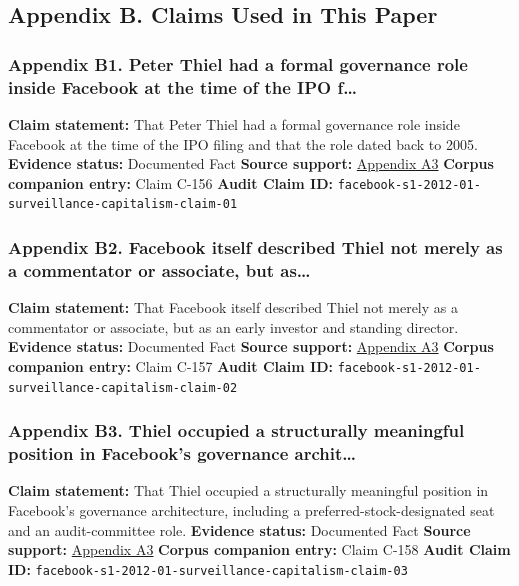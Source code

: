 \documentclass[
  american,
  11pt,
  letterpaper,
]{article}
\begin{document}
\subsection{Appendix B. Claims Used in This
Paper}\label{appendix-b.-claims-used-in-this-paper-1}

\subsubsection{Appendix B1. Peter Thiel had a formal governance role
inside Facebook at the time of the IPO
f\ldots{}}\label{ch-01-appendix-b1-peter-thiel-had-a-formal-governance-role-inside-facebook-at-the-time-of-the-ipo-f}

\textbf{Claim statement:} That Peter Thiel had a formal governance role
inside Facebook at the time of the IPO filing and that the role dated
back to 2005. \textbf{Evidence status:} Documented Fact \textbf{Source
support:}
\hyperref[ch-01-appendix-a3-facebook-inc-registration-statement-on-form-s-1]{Appendix
A3} \textbf{Corpus companion entry:} Claim C-156 \textbf{Audit Claim
ID:} \texttt{facebook-s1-2012-01-surveillance-capitalism-claim-01}

\subsubsection{Appendix B2. Facebook itself described Thiel not merely
as a commentator or associate, but
as\ldots{}}\label{ch-01-appendix-b2-facebook-itself-described-thiel-not-merely-as-a-commentator-or-associate-but-as}

\textbf{Claim statement:} That Facebook itself described Thiel not
merely as a commentator or associate, but as an early investor and
standing director. \textbf{Evidence status:} Documented Fact
\textbf{Source support:}
\hyperref[ch-01-appendix-a3-facebook-inc-registration-statement-on-form-s-1]{Appendix
A3} \textbf{Corpus companion entry:} Claim C-157 \textbf{Audit Claim
ID:} \texttt{facebook-s1-2012-01-surveillance-capitalism-claim-02}

\subsubsection{Appendix B3. Thiel occupied a structurally meaningful
position in Facebook's governance
archit\ldots{}}\label{ch-01-appendix-b3-thiel-occupied-a-structurally-meaningful-position-in-facebook-s-governance-archit}

\textbf{Claim statement:} That Thiel occupied a structurally meaningful
position in Facebook's governance architecture, including a
preferred-stock-designated seat and an audit-committee role.
\textbf{Evidence status:} Documented Fact \textbf{Source support:}
\hyperref[ch-01-appendix-a3-facebook-inc-registration-statement-on-form-s-1]{Appendix
A3} \textbf{Corpus companion entry:} Claim C-158 \textbf{Audit Claim
ID:} \texttt{facebook-s1-2012-01-surveillance-capitalism-claim-03}
\end{document}
